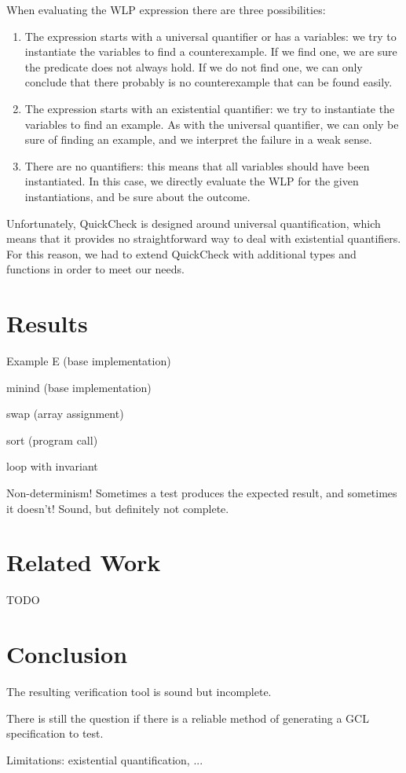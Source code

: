 \documentclass[a4paper]{article}
\begin{document}
When evaluating the WLP expression there are three possibilities:

\begin{enumerate}
\item The expression starts with a universal quantifier or has a variables:
we try to instantiate the variables to find a counterexample. If we find one, we
are sure the predicate does not always hold. If we do not find one, we can only
conclude that there probably is no counterexample that can be found easily.
\item The expression starts with an existential quantifier: we try to instantiate
the variables to find an example. As with the universal quantifier, we can only
be sure of finding an example, and we interpret the failure in a weak sense.
\item There are no quantifiers: this means that all variables should have been
instantiated. In this case, we directly evaluate the WLP for the given
instantiations, and be sure about the outcome.
\end{enumerate}

Unfortunately, QuickCheck is designed around universal quantification, which means
that it provides no straightforward way to deal with existential quantifiers.
For this reason, we had to extend QuickCheck with additional types and functions
in order to meet our needs.

\section{Results}

Example E (base implementation)

minind (base implementation)

swap (array assignment)

sort (program call)

loop with invariant

Non-determinism! Sometimes a test produces the expected result, and sometimes it doesn't!
Sound, but definitely not complete.

\section{Related Work}

TODO

\section{Conclusion}

The resulting verification tool is sound but incomplete.

There is still the question if there is a reliable method of generating a GCL
specification to test.

Limitations: existential quantification, ...



\end{document}
